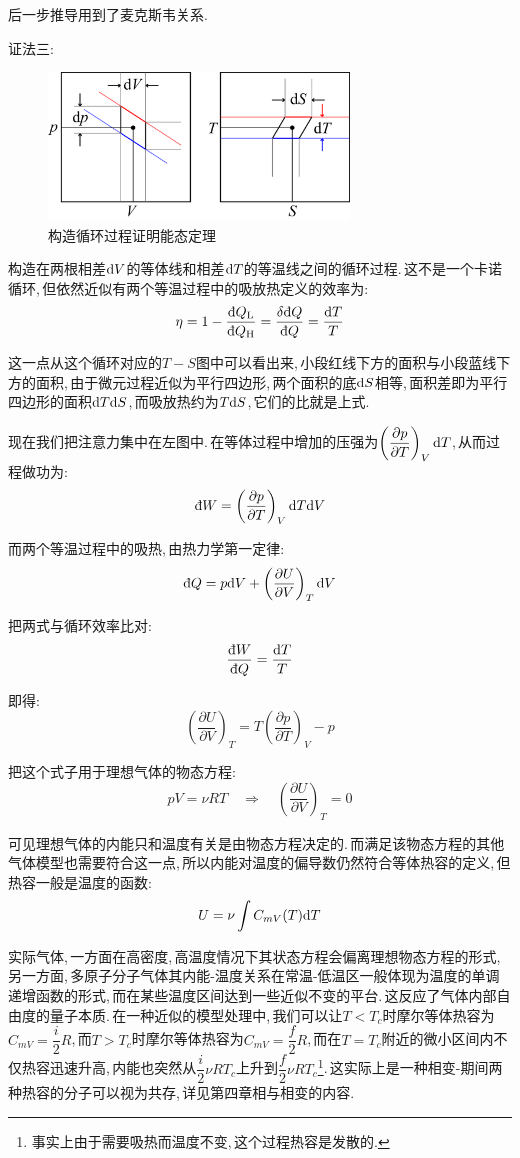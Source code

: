 后一步推导用到了麦克斯韦关系.

\vspace{1cm}
{\hei 证法三:}

\begin{figure}
\centering
\includegraphics[width=8cm]{image/5-2-18.png}
\caption{构造循环过程证明能态定理}
\end{figure}
构造在两根相差$\textrm{d} V$的等体线和相差$\textrm{d} T$的等温线之间的循环过程.\,这不是一个卡诺循环,\,但依然近似有两个等温过程中的吸放热定义的效率为:
\[\eta=1-\frac{\dbar Q_{\rm L}}{\dbar Q_{\rm H}}=\frac{\delta \dbar Q}{\dbar Q}=\frac{\ud T}{T}\]

这一点从这个循环对应的$T-S$图中可以看出来,\,小段红线下方的面积与小段蓝线下方的面积,\,由于微元过程近似为平行四边形,\,两个面积的底$\textrm{d} S$相等,\,面积差即为平行四边形的面积$\textrm{d} T \textrm{d} S$,\,而吸放热约为$T\textrm{d} S$,\,它们的比就是上式.

现在我们把注意力集中在左图中.\,在等体过程中增加的压强为$\left(\dfrac{\partial p}{\partial T}\right)_V\textrm{d} T$,\,从而过程做功为:
\[\dbar W=\left(\frac{\partial p}{\partial T}\right)_V\ud T\ud V\]

而两个等温过程中的吸热,\,由热力学第一定律:
\[\dbar Q=p\ud V+\left(\frac{\partial U}{\partial V}\right)_T \ud V\]

把两式与循环效率比对:
\[\frac{\dbar W}{\dbar Q}=\frac{\ud T}{T}\]

即得:
\[\left(\frac{\partial U}{\partial V}\right)_T=T\left(\frac{\partial p}{\partial T}\right)_V-p\]

\vspace{1cm}
把这个式子用于理想气体的物态方程:
\[pV=\nu RT\quad \Rightarrow \quad \left(\frac{\partial U}{\partial V}\right)_T=0\]

可见理想气体的内能只和温度有关是由物态方程决定的.\,而满足该物态方程的其他气体模型也需要符合这一点,\,所以内能对温度的偏导数仍然符合等体热容的定义,\,但热容一般是温度的函数:
\[U=\nu \int C_{mV}(T)\textrm{d} T\]

实际气体,\,一方面在高密度,\,高温度情况下其状态方程会偏离理想物态方程的形式,\,另一方面,\,多原子分子气体其内能-温度关系在常温-低温区一般体现为温度的单调递增函数的形式,\,而在某些温度区间达到一些近似不变的平台.\,这反应了气体内部自由度的量子本质.\,在一种近似的模型处理中,\,我们可以让$T<T_c$时摩尔等体热容为$C_{mV}=\dfrac{i}{2} R$,\,而$T>T_c$时摩尔等体热容为$C_{mV}=\dfrac{f}{2} R$,\,而在$T=T_c$附近的微小区间内不仅热容迅速升高,\,内能也突然从$\dfrac{i}{2}\nu RT_c$上升到$\dfrac{f}{2}\nu RT_c$\footnote{事实上由于需要吸热而温度不变,\,这个过程热容是发散的.}.\,这实际上是一种相变-期间两种热容的分子可以视为共存,\,详见第四章相与相变的内容.

